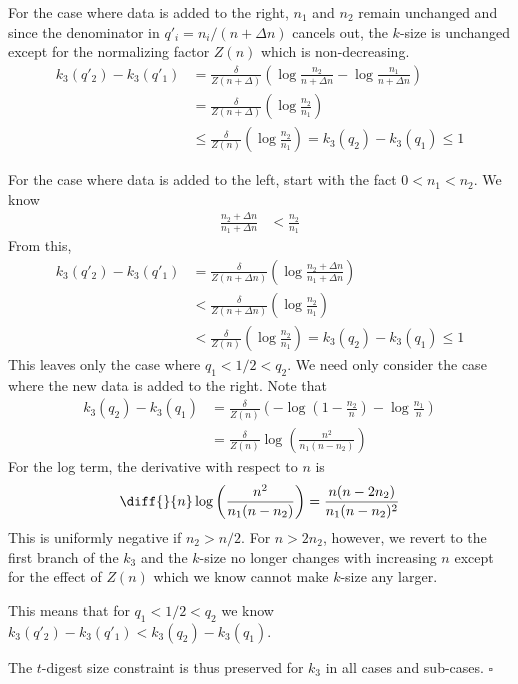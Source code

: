 \documentclass[11pt]{amsart}
\begin{document}
For the case where data is added to the right, $n_1$ and $n_2$ remain unchanged and since the denominator in $q'_i = n_i/(n+\Delta n)$ cancels out, the $k$-size is unchanged except for the normalizing factor $Z(n)$ which is non-decreasing.
\begin{align*}
k_3(q'_2)-k_3(q'_1) &= \frac {\delta} {Z(n+\Delta)} \left(\log  \frac {n_2} {n+\Delta n} - \log \frac {n_1}{n+\Delta n}  \right) \\
 &= \frac {\delta} {Z(n+\Delta)} \left(\log  \frac {n_2} {n_1} \right) \\
&\le\frac {\delta} {Z(n)} \left(\log  \frac {n_2} {n_1} \right)= k_3(q_2)-k_3(q_1)\le 1
\end{align*}

For the case where data is added to the left, start with the fact $0 < n_1 < n_2$. We know
\begin{align*}
\frac {n_2 + \Delta n} {n_1 + \Delta n} &< \frac {n_2} {n_1}
\end{align*}
From this, 
\begin{align*}
k_3(q'_2)-k_3(q'_1) &= \frac {\delta} {Z(n+\Delta n)} \left(\log  \frac {n_2+\Delta n} {n_1+\Delta n} \right) \\
&< \frac {\delta} {Z(n+\Delta n)} \left(\log  \frac {n_2} {n_1} \right) \\
&< \frac {\delta} {Z(n)} \left(\log  \frac {n_2} {n_1} \right) = k_3(q_2)-k_3(q_1) \le 1
\end{align*}
This leaves only the case where $q_1<1/2<q_2$. We need only consider the case where the new data is added to the right. Note that
\begin{align*}
k_3(q_2)-k_3(q_1) &= \frac {\delta} {Z(n)} \left(-\log \left( 1- \frac {n_2} {n} \right) - \log \frac {n_1} {n} \right) \\
 &= \frac {\delta} {Z(n)} \log \left( \frac {n^2} {n_1(n-n_2)}    \right) 
\end{align*}
For the log term, the derivative with respect to $n$ is
\[
\diff {} {n} \log \left( \frac {n^2} {n_1(n-n_2)}    \right) =\frac {n(n - 2n_2) }{n_1  (n - n_2)^2}
\]
This is uniformly negative if $n_2 > n/2$. For $n > 2 n_2$, however, we revert to the first branch of the $k_3$ and  the $k$-size no longer changes with increasing $n$ except for the effect of $Z(n)$ which we know cannot make $k$-size any larger. 

This means that for $q_1<1/2<q_2$ we know $k_3(q'_2) - k_3(q'_1) < k_3(q_2) - k_3(q_1)$.

The $t$-digest size constraint is thus preserved for $k_3$ in all cases and sub-cases.
$\square$


{}
\end{document}
